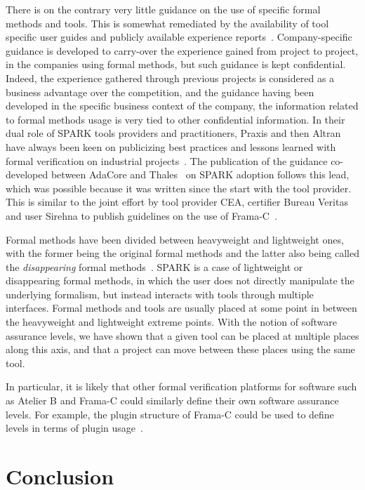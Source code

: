 \documentclass{eceasst}
\begin{document}
There is on the contrary very little guidance on the use of specific formal
methods and tools. This is somewhat remediated by the availability of tool
specific user guides and publicly available experience
reports~\cite{Woodcock2009}. Company-specific guidance is developed to
carry-over the experience gained from project to project, in the companies
using formal methods, but such guidance is kept confidential. Indeed, the
experience gathered through previous projects is considered as a business
advantage over the competition, and the guidance having been developed in the
specific business context of the company, the information related to formal
methods usage is very tied to other confidential information. In their dual
role of SPARK tools providers and practitioners, Praxis and then Altran have
always been keen on publicizing best practices and lessons learned with formal
verification on industrial
projects~\cite{KingHCP00,Chapman2006CCM,Chapman2014ITP}. The publication of the
guidance co-developed between AdaCore and Thales~\cite{AdaCoreThalesSPARK} on
SPARK adoption follows this lead, which was possible because it was written
since the start with the tool provider. This is similar to the joint effort by
tool provider CEA, certifier Bureau Veritas and user Sirehna to publish
guidelines on the use of Frama-C~\cite{FramaCguidelines}.

Formal methods have been divided between heavyweight and lightweight ones, with
the former being the original formal methods and the latter also being called
the \textit{disappearing} formal methods~\cite{hase00}. SPARK is a case of
lightweight or disappearing formal methods, in which the user does not directly
manipulate the underlying formalism, but instead interacts with tools through
multiple interfaces. Formal methods and tools are usually placed at some point
in between the heavyweight and lightweight extreme points. With the notion of
software assurance levels, we have shown that a given tool can be placed at
multiple places along this axis, and that a project can move between these
places using the same tool.

In particular, it is likely that other formal verification platforms for
software such as Atelier B and Frama-C could similarly define their own
software assurance levels. For example, the plugin structure of Frama-C could
be used to define levels in terms of plugin usage~\cite{Kirchner2015}.

\section{Conclusion}
\label{sec:conclusion}
\end{document}
